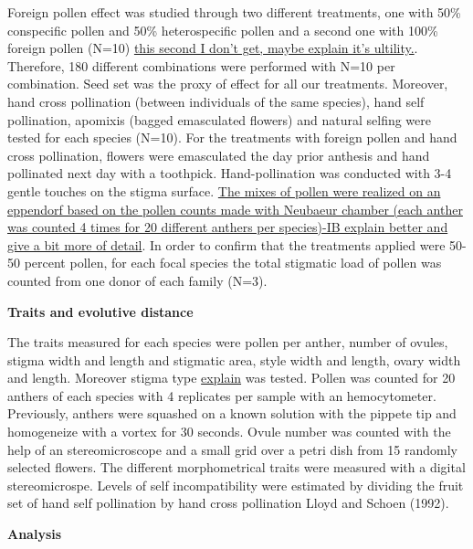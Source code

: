 \documentclass[11pt,a4paper]{article}
\begin{document}
Foreign pollen effect was studied through two different treatments, one
with 50\% conspecific pollen and 50\% heterospecific pollen and a second
one with 100\% foreign pollen (N=10) \href{}{this second I don't get,
maybe explain it's ultility.}. Therefore, 180 different combinations
were performed with N=10 per combination. Seed set was the proxy of
effect for all our treatments. Moreover, hand cross pollination (between
individuals of the same species), hand self pollination, apomixis
(bagged emasculated flowers) and natural selfing were tested for each
species (N=10). For the treatments with foreign pollen and hand cross
pollination, flowers were emasculated the day prior anthesis and hand
pollinated next day with a toothpick. Hand-pollination was conducted
with 3-4 gentle touches on the stigma surface. \href{}{The mixes of
pollen were realized on an eppendorf based on the pollen counts made
with Neubaeur chamber (each anther was counted 4 times for 20 different
anthers per species)-IB explain better and give a bit more of detail}.
In order to confirm that the treatments applied were 50-50 percent
pollen, for each focal species the total stigmatic load of pollen was
counted from one donor of each family (N=3).

\textbf{Traits and evolutive distance}

The traits measured for each species were pollen per anther, number of
ovules, stigma width and length and stigmatic area, style width and
length, ovary width and length. Moreover stigma type \href{}{explain}
was tested. Pollen was counted for 20 anthers of each species with 4
replicates per sample with an hemocytometer. Previously, anthers were
squashed on a known solution with the pippete tip and homogeneize with a
vortex for 30 seconds. Ovule number was counted with the help of an
stereomicroscope and a small grid over a petri dish from 15 randomly
selected flowers. The different morphometrical traits were measured with
a digital stereomicrospe. Levels of self incompatibility were estimated
by dividing the fruit set of hand self pollination by hand cross
pollination Lloyd and Schoen (1992).

\textbf{Analysis}
\end{document}
